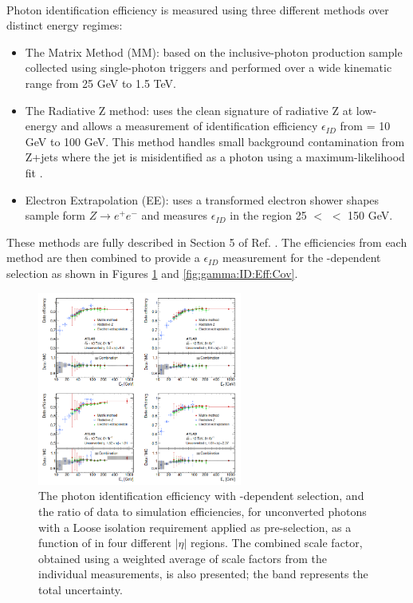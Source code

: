 \\
Photon identification efficiency is measured using three different methods over distinct energy regimes:
\begin{itemize}
\item The Matrix Method (MM): based on the inclusive-photon production sample collected using single-photon triggers and performed over a wide kinematic range from 25 GeV to 1.5 TeV. 
\item The Radiative Z method: uses the clean signature of radiative Z at low-energy and allows a measurement of identification efficiency $\epsilon_{ID}$ from \eT = 10 GeV to 100 GeV. This method handles small background contamination from Z+jets where the jet is misidentified as a photon using a maximum-likelihood fit \cite{Photon_Eff_Run1}. 
\item Electron Extrapolation (EE): uses a transformed electron shower shapes sample form $Z\rightarrow e^+e^-$ and measures $\epsilon_{ID}$ in the region 25 $<$ \eT $<$ 150 GeV.
\end{itemize}
These methods are fully described in Section 5 of Ref. \cite{Photon_Eff_2015}. The efficiencies from each method are then combined to provide a $\epsilon_{ID}$ measurement for the \eT-dependent selection as shown in Figures \ref{fig:gamma:ID:Eff:UnCov} and \ref{fig:gamma:ID:Eff:Cov}. 
\begin{figure}[htbp]
    \centering
    \includegraphics[width=0.6\textwidth]{Ch3/Img/Unconverted_Eff_2017.png}
    \caption{The photon identification efficiency with \eT-dependent selection, and the ratio of data to simulation efficiencies, for unconverted photons with a Loose isolation requirement applied as pre-selection, as a function of \eT in four different $|\eta|$ regions. The combined scale factor, obtained using a weighted average of scale factors from the individual measurements, is also presented; the band represents the total uncertainty.}
    \label{fig:gamma:ID:Eff:UnCov}
\end{figure}
